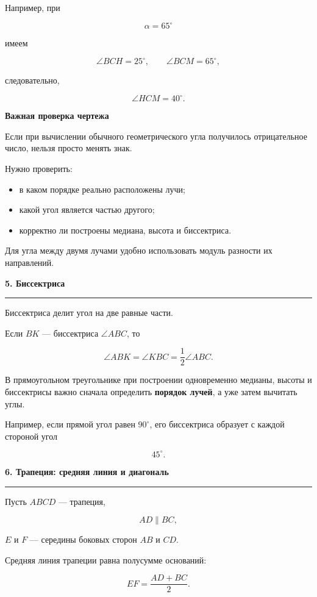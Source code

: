 \documentclass[a4paper,12pt]{article}
\newcommand{\topic}[1]{%
  \vspace{0.8em}
  {\Large\bfseries\textcolor{darkaccent}{#1}}\par
  \vspace{0.25em}
  {\color{accent}\rule{\linewidth}{0.6pt}}
  \vspace{0.45em}
}
\newcommand{\subtopic}[1]{%
  \vspace{0.45em}
  {\large\bfseries\textcolor{accent}{#1}}\par
  \vspace{0.2em}
}
\newcommand{\key}[1]{\textcolor{darkaccent}{\textbf{#1}}}
\begin{document}
Например, при

\[
\alpha=65^\circ
\]

имеем

\[
\angle BCH=25^\circ,
\qquad
\angle BCM=65^\circ,
\]

следовательно,

\[
\boxed{
\angle HCM=40^\circ.
}
\]

\subtopic{Важная проверка чертежа}

Если при вычислении обычного геометрического угла получилось отрицательное число, нельзя просто менять знак.

Нужно проверить:

\begin{itemize}
  \item в каком порядке реально расположены лучи;
  \item какой угол является частью другого;
  \item корректно ли построены медиана, высота и биссектриса.
\end{itemize}

Для угла между двумя лучами удобно использовать модуль разности их направлений.


\topic{5. Биссектриса}

Биссектриса делит угол на две равные части.

Если \(BK\) --- биссектриса \(\angle ABC\), то

\[
\boxed{
\angle ABK=\angle KBC
=
\frac12\angle ABC.
}
\]

В прямоугольном треугольнике при построении одновременно медианы, высоты и биссектрисы важно сначала определить \key{порядок лучей}, а уже затем вычитать углы.

Например, если прямой угол равен \(90^\circ\), его биссектриса образует с каждой стороной угол

\[
45^\circ.
\]


\topic{6. Трапеция: средняя линия и диагональ}

Пусть \(ABCD\) --- трапеция,

\[
AD\parallel BC,
\]

\(E\) и \(F\) --- середины боковых сторон \(AB\) и \(CD\).

Средняя линия трапеции равна полусумме оснований:

\[
\boxed{
EF=\frac{AD+BC}{2}.
}
\]
\end{document}
